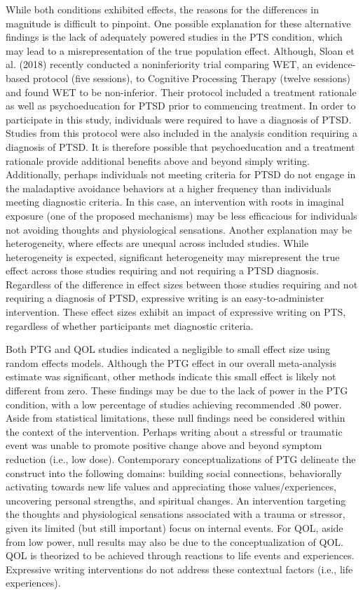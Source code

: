 \documentclass[,man]{apa6}
\begin{document}
While both conditions exhibited effects, the reasons for the differences in magnitude is difficult to pinpoint. One possible explanation for these alternative findings is the lack of adequately powered studies in the PTS condition, which may lead to a misrepresentation of the true population effect. Although, Sloan et al. (2018) recently conducted a noninferiority trial comparing WET, an evidence-based protocol (five sessions), to Cognitive Processing Therapy (twelve sessions) and found WET to be non-inferior. Their protocol included a treatment rationale as well as psychoeducation for PTSD prior to commencing treatment. In order to participate in this study, individuals were required to have a diagnosis of PTSD. Studies from this protocol were also included in the analysis condition requiring a diagnosis of PTSD. It is therefore possible that psychoeducation and a treatment rationale provide additional benefits above and beyond simply writing. Additionally, perhaps individuals not meeting criteria for PTSD do not engage in the maladaptive avoidance behaviors at a higher frequency than individuals meeting diagnostic criteria. In this case, an intervention with roots in imaginal exposure (one of the proposed mechanisms) may be less efficacious for individuals not avoiding thoughts and physiological sensations. Another explanation may be heterogeneity, where effects are unequal across included studies. While heterogeneity is expected, significant heterogeneity may misrepresent the true effect across those studies requiring and not requiring a PTSD diagnosis. Regardless of the difference in effect sizes between those studies requiring and not requiring a diagnosis of PTSD, expressive writing is an easy-to-administer intervention. These effect sizes exhibit an impact of expressive writing on PTS, regardless of whether participants met diagnostic criteria.

Both PTG and QOL studies indicated a negligible to small effect size using random effects models. Although the PTG effect in our overall meta-analysis estimate was significant, other methods indicate this small effect is likely not different from zero. These findings may be due to the lack of power in the PTG condition, with a low percentage of studies achieving recommended .80 power. Aside from statistical limitations, these null findings need be considered within the context of the intervention. Perhaps writing about a stressful or traumatic event was unable to promote positive change above and beyond symptom reduction (i.e., low dose). Contemporary conceptualizations of PTG delineate the construct into the following domains: building social connections, behaviorally activating towards new life values and appreciating those values/experiences, uncovering personal strengths, and spiritual changes. An intervention targeting the thoughts and physiological sensations associated with a trauma or stressor, given its limited (but still important) focus on internal events. For QOL, aside from low power, null results may also be due to the conceptualization of QOL. QOL is theorized to be achieved through reactions to life events and experiences. Expressive writing interventions do not address these contextual factors (i.e., life experiences).
\end{document}
